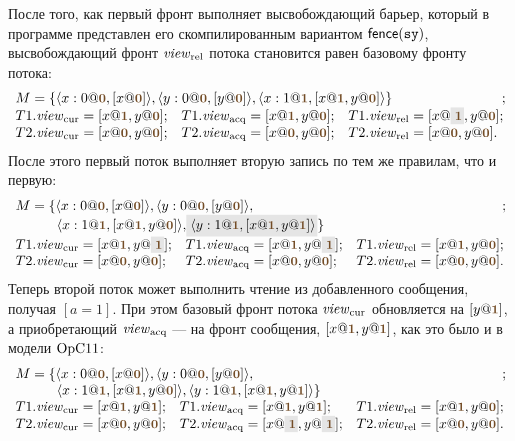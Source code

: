 После того, как первый фронт выполняет высвобождающий барьер, который в программе представлен его скомпилированным
вариантом $\mathsf{fence}({\mathtt{sy}})$, высвобождающий фронт $\mathit{view}_{\mathrm{rel}}$ потока становится равен базовому фронту потока:
\[
\begin{array}{l l l}
\multicolumn{3}{l}{M = \{\angled{x:0@\tstamp{0}, [x@\tstamp{0}]}, \angled{y:0@\tstamp{0}, [y@\tstamp{0}]},
  \angled{x:1@\tstamp{1}, [x@\tstamp{1}, y@\tstamp{0}]} \}}; \\
T1.\Rcur = [x@\tstamp{1}, y@\tstamp{0}];           &
T1.\Racq = [x@\tstamp{1}, y@\tstamp{0}];           &
T1.\Rrel = [x@\graybox{\tstamp{1}}, y@\tstamp{0}]; \\
T2.\Rcur = [x@\tstamp{0}, y@\tstamp{0}]; &
T2.\Racq = [x@\tstamp{0}, y@\tstamp{0}]; &
T2.\Rrel = [x@\tstamp{0}, y@\tstamp{0}]. \\
\end{array}
\]
После этого первый поток выполняет вторую запись по тем же правилам, что и первую:
\[
\begin{array}{l l l}
\multicolumn{3}{l}{M = \{\angled{x:0@\tstamp{0}, [x@\tstamp{0}]}, \angled{y:0@\tstamp{0}, [y@\tstamp{0}]},}; \\
\multicolumn{3}{l}{
\quad \quad \quad \angled{x:1@\tstamp{1}, [x@\tstamp{1}, y@\tstamp{0}]}, \graybox{\angled{y:1@\tstamp{1}, [x@\tstamp{1}, y@\tstamp{1}]}} \}} \\
T1.\Rcur = [x@\tstamp{1}, y@\graybox{\tstamp{1}}]; &
T1.\Racq = [x@\tstamp{1}, y@\graybox{\tstamp{1}}]; &
T1.\Rrel = [x@\tstamp{1}, y@\tstamp{0}]; \\
T2.\Rcur = [x@\tstamp{0}, y@\tstamp{0}]; &
T2.\Racq = [x@\tstamp{0}, y@\tstamp{0}]; &
T2.\Rrel = [x@\tstamp{0}, y@\tstamp{0}]. \\
\end{array}
\]
Теперь второй поток может выполнить чтение из добавленного сообщения, получая $[a = 1]$.
При этом базовый фронт потока $\mathit{view}_{\mathrm{cur}}$ обновляется на $[y@\tstamp{1}]$, а приобретающий $\mathit{view}_{\mathrm{acq}}$ --- на фронт сообщения,
$[x@\tstamp{1}, y@\tstamp{1}]$, как это было и в модели $\mathrm{OpC11}$:
\[
\begin{array}{l l l}
\multicolumn{3}{l}{M = \{\angled{x:0@\tstamp{0}, [x@\tstamp{0}]}, \angled{y:0@\tstamp{0}, [y@\tstamp{0}]},}; \\
\multicolumn{3}{l}{
\quad \quad \quad \angled{x:1@\tstamp{1}, [x@\tstamp{1}, y@\tstamp{0}]}, \angled{y:1@\tstamp{1}, [x@\tstamp{1}, y@\tstamp{1}]} \}} \\
T1.\Rcur = [x@\tstamp{1}, y@\tstamp{1}]; &
T1.\Racq = [x@\tstamp{1}, y@\tstamp{1}]; &
T1.\Rrel = [x@\tstamp{1}, y@\tstamp{0}]; \\
T2.\Rcur = [x@\tstamp{0}, y@\tstamp{0}]; &
T2.\Racq = [x@\graybox{\tstamp{1}}, y@\graybox{\tstamp{1}}]; &
T2.\Rrel = [x@\tstamp{0}, y@\tstamp{0}]. \\
\end{array}
\]
